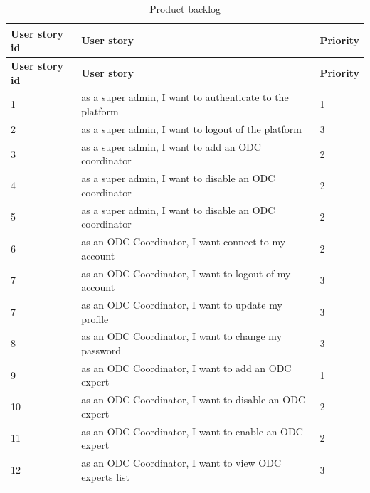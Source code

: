 \begin{longtable}{|l|l|l|}
      \caption{Product backlog}                                                                             \\    %
      \hline
      \textbf{User story id} & \textbf{User story}                                      & \textbf{Priority} \\ \hline
      \endfirsthead
      \hline
      \textbf{User story id} & \textbf{User story}                                      & \textbf{Priority} \\ \hline
      \endhead
      \endlastfoot
      1                      & as a super admin, I want to authenticate to the platform & 1                 \\ \hline
      2                      & as a super admin, I want to logout of the platform       & 3                 \\ \hline
      3                      & as a super admin, I want to add an ODC coordinator       & 2                 \\ \hline
      4                      & as a super admin, I want to disable an ODC coordinator   & 2                 \\ \hline
      5                      & as a super admin, I want to disable an ODC coordinator   & 2                 \\ \hline
      6                      & as an ODC Coordinator, I want connect to my account      & 2                 \\ \hline
      7                      & as an ODC Coordinator, I want to logout of my account    & 3                 \\ \hline
      7                      & as an ODC Coordinator, I want to update my profile       & 3                 \\ \hline
      8                      & as an ODC Coordinator, I want to change my password      & 3                 \\ \hline
      9                      & as an ODC Coordinator, I want to add an ODC expert       & 1                 \\ \hline
      10                     & as an ODC Coordinator, I want to disable an ODC expert   & 2                 \\ \hline
      11                     & as an ODC Coordinator, I want to enable an ODC expert    & 2                 \\ \hline
      12                     & as an ODC Coordinator, I want to view ODC experts list   & 3                 \\ \hline

\end{longtable}
